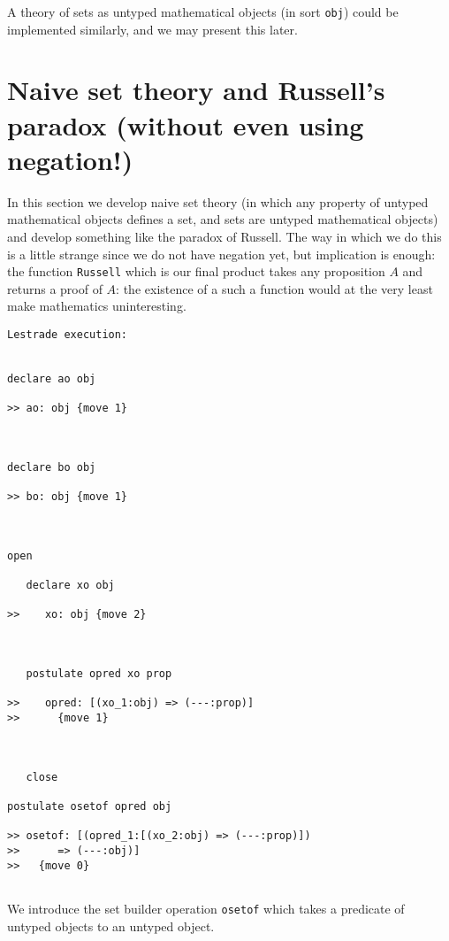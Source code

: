 \documentclass[12pt]{article}
\begin{document}
A theory of sets as untyped mathematical objects (in sort {\tt obj}) could be implemented similarly, and we may present this later.

\section{Naive set theory and Russell's paradox (without even using negation!)}

In this section we develop naive set theory (in which any property of untyped mathematical objects defines a set, and sets are untyped mathematical objects)
and develop something like the paradox of Russell.  The way in which we do this is a little strange since we do not have negation yet, but implication is enough:  the function {\tt Russell} which is our final product takes any proposition $A$ and returns a proof of $A$:  the existence of a such a function would at the very least make mathematics uninteresting.

\begin{verbatim}Lestrade execution:


declare ao obj

>> ao: obj {move 1}



declare bo obj

>> bo: obj {move 1}



open

   declare xo obj

>>    xo: obj {move 2}



   postulate opred xo prop

>>    opred: [(xo_1:obj) => (---:prop)]
>>      {move 1}



   close

postulate osetof opred obj

>> osetof: [(opred_1:[(xo_2:obj) => (---:prop)])
>>      => (---:obj)]
>>   {move 0}


\end{verbatim}

We introduce the set builder operation {\tt osetof} which takes a predicate of untyped objects to an untyped object.
\end{document}
